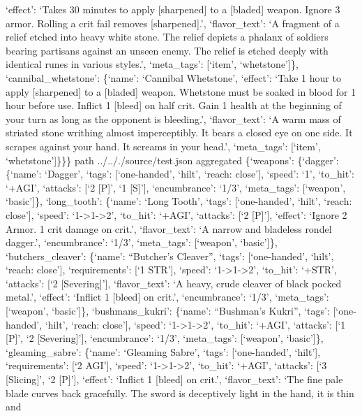 \documentclass[
  letterpaper,
  DIV=11,
  numbers=noendperiod]{scrartcl}
\begin{document}
`effect': `Takes 30 minutes to apply {[}sharpened{]} to a {[}bladed{]}
weapon. Ignore 3 armor. Rolling a crit fail removes {[}sharpened{]}.',
`flavor\_text': `A fragment of a relief etched into heavy white stone.
The relief depicts a phalanx of soldiers bearing partisans against an
unseen enemy. The relief is etched deeply with identical runes in
various styles.', `meta\_tags': {[}`item', `whetstone'{]}\},
`cannibal\_whetstone': \{`name': `Cannibal Whetstone', `effect': `Take 1
hour to apply {[}sharpened{]} to a {[}bladed{]} weapon. Whetstone must
be soaked in blood for 1 hour before use. Inflict 1 {[}bleed{]} on half
crit. Gain 1 health at the beginning of your turn as long as the
opponent is bleeding.', `flavor\_text': `A warm mass of striated stone
writhing almost imperceptibly. It bears a closed eye on one side. It
scrapes against your hand. It screams in your head.', `meta\_tags':
{[}`item', `whetstone'{]}\}\}\} path ../.././source/test.json aggregated
\{`weapons': \{`dagger': \{`name': `Dagger', `tags': {[}`one-handed',
`hilt', `reach: close'{]}, `speed': `1', `to\_hit': `+AGI', `attacks':
{[}`2 {[}P{]}', `1 {[}S{]}'{]}, `encumbrance': `1/3', `meta\_tags':
{[}`weapon', `basic'{]}\}, `long\_tooth': \{`name': `Long Tooth',
`tags': {[}`one-handed', `hilt', `reach: close'{]}, `speed':
`1-\textgreater1-\textgreater2', `to\_hit': `+AGI', `attacks': {[}`2
{[}P{]}'{]}, `effect': `Ignore 2 Armor. 1 crit damage on crit.',
`flavor\_text': `A narrow and bladeless rondel dagger.', `encumbrance':
`1/3', `meta\_tags': {[}`weapon', `basic'{]}\}, `butchers\_cleaver':
\{`name': ``Butcher's Cleaver'', `tags': {[}`one-handed', `hilt',
`reach: close'{]}, `requirements': {[}`1 STR'{]}, `speed':
`1-\textgreater1-\textgreater2', `to\_hit': `+STR', `attacks': {[}`2
{[}Severing{]}'{]}, `flavor\_text': `A heavy, crude cleaver of black
pocked metal.', `effect': `Inflict 1 {[}bleed{]} on crit.',
`encumbrance': `1/3', `meta\_tags': {[}`weapon', `basic'{]}\},
`bushmans\_kukri': \{`name': ``Bushman's Kukri'', `tags':
{[}`one-handed', `hilt', `reach: close'{]}, `speed':
`1-\textgreater1-\textgreater2', `to\_hit': `+AGI', `attacks': {[}`1
{[}P{]}', `2 {[}Severing{]}'{]}, `encumbrance': `1/3', `meta\_tags':
{[}`weapon', `basic'{]}\}, `gleaming\_sabre': \{`name': `Gleaming
Sabre', `tags': {[}`one-handed', `hilt'{]}, `requirements': {[}`2
AGI'{]}, `speed': `1-\textgreater1-\textgreater2', `to\_hit': `+AGI',
`attacks': {[}`3 {[}Slicing{]}', `2 {[}P{]}'{]}, `effect': `Inflict 1
{[}bleed{]} on crit.', `flavor\_text': `The fine pale blade curves back
gracefully. The sword is deceptively light in the hand, it is thin and
\end{document}
